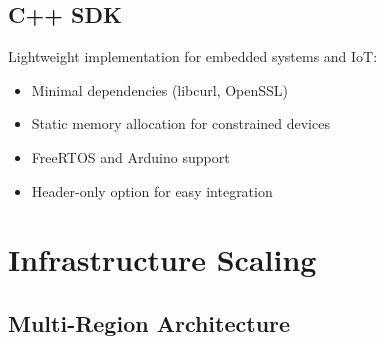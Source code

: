 \subsection{C++ SDK}
\label{subsec:cpp-sdk}

Lightweight implementation for embedded systems and IoT:
\begin{itemize}
    \item Minimal dependencies (libcurl, OpenSSL)
    \item Static memory allocation for constrained devices
    \item FreeRTOS and Arduino support
    \item Header-only option for easy integration
\end{itemize}

\section{Infrastructure Scaling}
\label{sec:infrastructure-future}

\subsection{Multi-Region Architecture}

